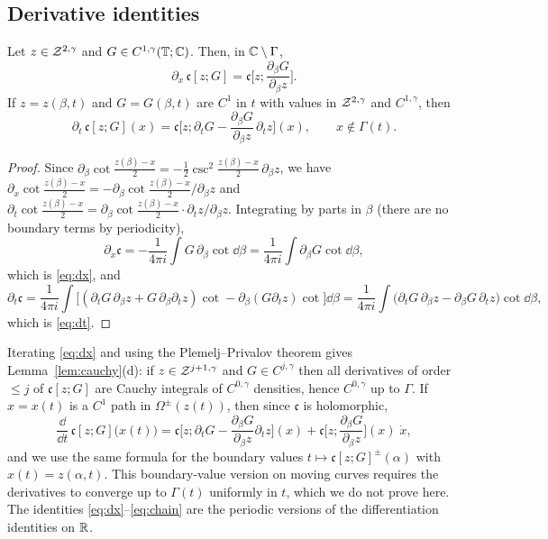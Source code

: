 \subsection{Derivative identities}
\begin{lemma}\label{lem:identities}
Let $z\in\mathcal{Z}^{2,\gamma}$ and $G\in C^{1,\gamma}(\mathbb{T};\mathbb{C})$. Then, in $\mathbb{C}\setminus\Gamma$,
\begin{equation}\label{eq:dx}
\partial_x\,\mathfrak c[z;G]=\mathfrak c\Big[z;\frac{\partial_\beta G}{\partial_\beta z}\Big].
\end{equation}
If $z=z(\beta,t)$ and $G=G(\beta,t)$ are $C^1$ in $t$ with values in $\mathcal{Z}^{2,\gamma}$ and $C^{1,\gamma}$, then
\begin{equation}\label{eq:dt}
\partial_t\,\mathfrak c[z;G](x)=\mathfrak c\Big[z;\partial_tG-\frac{\partial_\beta G}{\partial_\beta z}\,\partial_tz\Big](x),\qquad x\notin\Gamma(t).
\end{equation}
\end{lemma}

\begin{proof}
Since $\partial_\beta\cot\frac{z(\beta)-x}2=-\frac12\csc^2\frac{z(\beta)-x}2\,\partial_\beta z$, we have $\partial_x\cot\frac{z(\beta)-x}2=-\partial_\beta\cot\frac{z(\beta)-x}2/\partial_\beta z$ and
$\partial_t\cot\frac{z(\beta)-x}2=\partial_\beta\cot\frac{z(\beta)-x}2\cdot\partial_tz/\partial_\beta z$. Integrating by parts in $\beta$ (there are no boundary terms by periodicity),
\[
\partial_x\mathfrak c=-\frac1{4\pi i}\int G\,\partial_\beta\cot\dd\beta=\frac1{4\pi i}\int\partial_\beta G\cot\dd\beta,
\]
which is \eqref{eq:dx}, and
\[
\partial_t\mathfrak c=\frac1{4\pi i}\int\Big[(\partial_tG\,\partial_\beta z+G\,\partial_\beta\partial_tz)\cot-\partial_\beta(G\partial_tz)\cot\Big]\dd\beta
=\frac1{4\pi i}\int\big(\partial_tG\,\partial_\beta z-\partial_\beta G\,\partial_tz\big)\cot\dd\beta,
\]
which is \eqref{eq:dt}.
\end{proof}

Iterating \eqref{eq:dx} and using the Plemelj--Privalov theorem gives Lemma~\ref{lem:cauchy}(d): if $z\in\mathcal{Z}^{j+1,\gamma}$ and $G\in C^{j,\gamma}$ then all derivatives of order $\le j$ of $\mathfrak c[z;G]$ are
Cauchy integrals of $C^{0,\gamma}$ densities, hence $C^{0,\gamma}$ up to $\Gamma$. If $x=x(t)$ is a $C^1$ path in $\Omega^\pm(z(t))$, then since $\mathfrak c$ is holomorphic,
\begin{equation}\label{eq:chain}
\frac{\dd}{\dd t}\,\mathfrak c[z;G]\big(x(t)\big)=\mathfrak c\Big[z;\partial_tG-\frac{\partial_\beta G}{\partial_\beta z}\partial_tz\Big](x)+\mathfrak c\Big[z;\frac{\partial_\beta G}{\partial_\beta z}\Big](x)\;\dot x,
\end{equation}
and we use the same formula for the boundary values $t\mapsto\mathfrak c[z;G]^\pm(\alpha)$ with $x(t)=z(\alpha,t)$. This boundary-value version on moving curves requires the derivatives to
converge up to $\Gamma(t)$ uniformly in $t$, which we do not prove here. The identities \eqref{eq:dx}--\eqref{eq:chain} are the periodic versions of the differentiation identities
\cite[(5.11), (8.5), (8.24)--(8.25)]{LM26} on $\mathbb{R}$.

